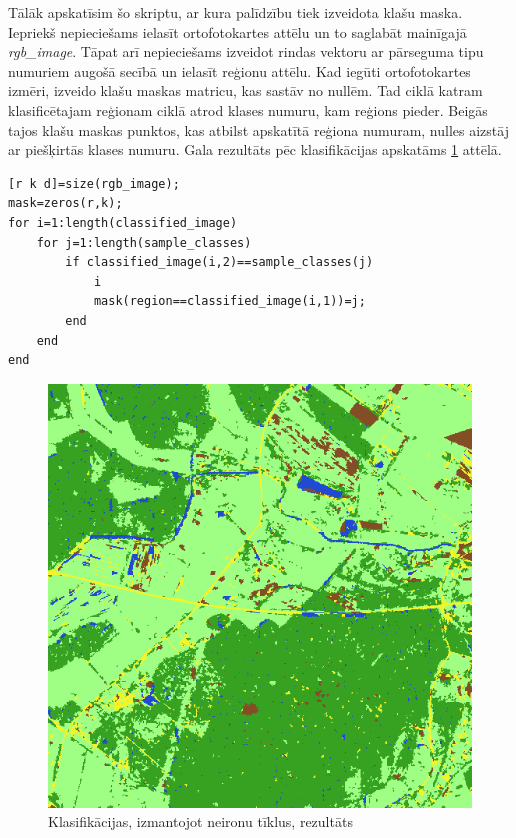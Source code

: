 \documentclass[12pt,paper=a4]{report}
\begin{document}
Tālāk apskatīsim šo skriptu, ar kura palīdzību tiek izveidota klašu maska. Iepriekš nepieciešams ielasīt ortofotokartes attēlu un to saglabāt mainīgajā \textit{rgb_image}. Tāpat arī nepieciešams izveidot rindas vektoru ar pārseguma tipu numuriem augošā secībā un ielasīt reģionu attēlu. Kad iegūti ortofotokartes izmēri, izveido klašu maskas matricu, kas sastāv no nullēm. Tad ciklā katram klasificētajam reģionam ciklā atrod klases numuru, kam reģions pieder. Beigās tajos klašu maskas punktos, kas atbilst apskatītā reģiona numuram, nulles aizstāj ar piešķirtās klases numuru. Gala rezultāts pēc klasifikācijas apskatāms \ref{fig:resultNN} attēlā.
\begin{lstlisting}
[r k d]=size(rgb_image);
mask=zeros(r,k);
for i=1:length(classified_image)
    for j=1:length(sample_classes)
        if classified_image(i,2)==sample_classes(j)
            i
            mask(region==classified_image(i,1))=j;
        end
    end
end
\end{lstlisting}
\begin{figure}[h!]
\centering
\includegraphics[width=.6\linewidth]{resultNN}
\caption{Klasifikācijas, izmantojot neironu tīklus, rezultāts}
\label{fig:resultNN}
\end{figure}
\end{document}
